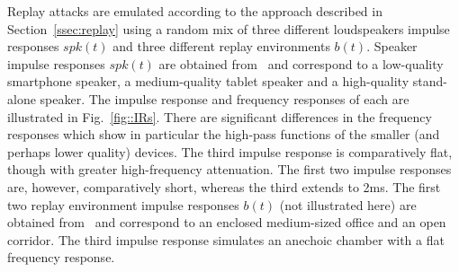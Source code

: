 Replay attacks are emulated according to the approach described in Section~\ref{ssec:replay} 
using a random mix of three different loudspeakers impulse responses $spk(t)$ and three different replay environments $b(t)$.  
Speaker impulse responses $spk(t)$ are obtained from~\cite{Brown2014} and correspond to a low-quality smartphone speaker, a medium-quality tablet speaker and a high-quality stand-alone speaker.  The impulse response and frequency responses of each are illustrated in Fig.~\ref{fig::IRs}.  There are significant differences in the frequency responses which show in particular the high-pass functions of the smaller (and perhaps lower quality) devices.  The third impulse response is comparatively flat, though with greater high-frequency attenuation.  The first two impulse responses are, however, comparatively short, whereas the third extends to 2ms.  The first two replay environment impulse responses $b(t)$ (not illustrated here) are obtained from~\cite{Jeub2009} and correspond to an enclosed medium-sized office and an open corridor.   %
The third impulse response simulates an anechoic chamber with a flat frequency response. 






